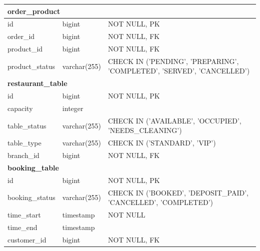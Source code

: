 \begin{longtable}{|p{3.5cm}|p{3.5cm}|p{7.5cm}|}
	\multicolumn{3}{|l|}{\textbf{order\_product}}                                                                       \\
	\hline
	id                  & bigint                & NOT NULL, PK                                                          \\
	order\_id           & bigint                & NOT NULL, FK                                                          \\
	product\_id         & bigint                & NOT NULL, FK                                                          \\
	product\_status     & varchar(255)          & CHECK IN ('PENDING', 'PREPARING', 'COMPLETED', 'SERVED', 'CANCELLED') \\
	\hline

	\multicolumn{3}{|l|}{\textbf{restaurant\_table}}                                                                    \\
	\hline
	id                  & bigint                & NOT NULL, PK                                                          \\
	capacity            & integer               &                                                                       \\
	table\_status       & varchar(255)          & CHECK IN ('AVAILABLE', 'OCCUPIED', 'NEEDS\_CLEANING')                 \\
	table\_type         & varchar(255)          & CHECK IN ('STANDARD', 'VIP')                                          \\
	branch\_id          & bigint                & NOT NULL, FK                                                          \\
	\hline

	\multicolumn{3}{|l|}{\textbf{booking\_table}}                                                                       \\
	\hline
	id                  & bigint                & NOT NULL, PK                                                          \\
	booking\_status     & varchar(255)          & CHECK IN ('BOOKED', 'DEPOSIT\_PAID', 'CANCELLED', 'COMPLETED')        \\
	time\_start         & timestamp             & NOT NULL                                                              \\
	time\_end           & timestamp             &                                                                       \\
	customer\_id        & bigint                & NOT NULL, FK                                                          \\
	\hline


\end{longtable}
